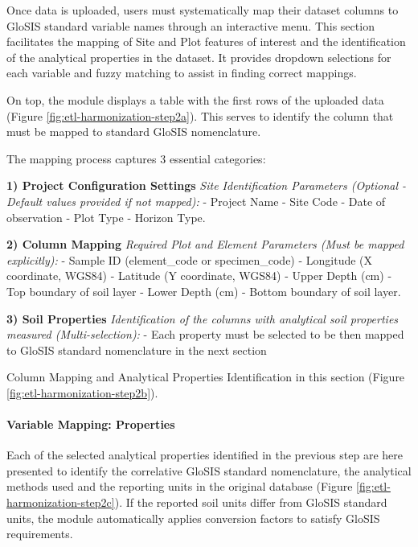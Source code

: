 \documentclass[
  10pt,
  b5paper,
  oneside]{book}
\begin{document}
Once data is uploaded, users must systematically map their dataset columns to GloSIS standard variable names through an interactive menu. This section facilitates the mapping of Site and Plot features of interest and the identification of the analytical properties in the dataset. It provides dropdown selections for each variable and fuzzy matching to assist in finding correct mappings.

On top, the module displays a table with the first rows of the uploaded data (Figure \ref{fig:etl-harmonization-step2a}). This serves to identify the column that must be mapped to standard GloSIS nomenclature.

The mapping process captures 3 essential categories:

\textbf{1) Project Configuration Settings} \emph{Site Identification Parameters (Optional - Default values provided if not mapped):} - Project Name - Site Code - Date of observation - Plot Type - Horizon Type.

\textbf{2) Column Mapping } \emph{Required Plot and Element Parameters (Must be mapped explicitly):} - Sample ID (element\_code or specimen\_code) - Longitude (X coordinate, WGS84) - Latitude (Y coordinate, WGS84) - Upper Depth (cm) - Top boundary of soil layer - Lower Depth (cm) - Bottom boundary of soil layer.

\textbf{3) Soil Properties } \emph{Identification of the columns with analytical soil properties measured (Multi-selection):} - Each property must be selected to be then mapped to GloSIS standard nomenclature in the next section

Column Mapping and Analytical Properties Identification in this section (Figure \ref{fig:etl-harmonization-step2b}).

\paragraph*{Variable Mapping: Properties}\label{variable-mapping-properties}

Each of the selected analytical properties identified in the previous step are here presented to identify the correlative GloSIS standard nomenclature, the analytical methods used and the reporting units in the original database (Figure \ref{fig:etl-harmonization-step2c}). If the reported soil units differ from GloSIS standard units, the module automatically applies conversion factors to satisfy GloSIS requirements.
\end{document}
